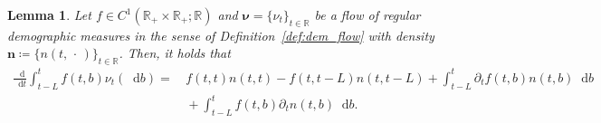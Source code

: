 \documentclass[10pt,a4paper]{amsart}
\theoremstyle{plain}
\newtheorem{lem}{Lemma}
\theoremstyle{plain}
\theoremstyle{definition}
\theoremstyle{remark}
\newcommand{\bn}{\mathbf{n}}
\newcommand{\bnu}{\boldsymbol{\nu}}
\newcommand{\dd}{\mathop{}\!\mathrm{d}}
\newcommand{\mbR}{\mathbb{R}}
\begin{document}
\begin{lem}\label{lem:diff_two_param_function_integral}
   Let $f\in C^1(\mbR_+\times \mbR_+ ;\mbR)$ and $\bnu = \{\nu_t\}_{t\in \mbR}$ be a flow of \emph{regular demographic measures} in the sense of Definition~\ref{def:dem_flow} with density $\bn \coloneqq \{n(t,\,\cdot\,)\}_{t\in \mbR}$. Then, it holds that
\begin{align*}
    \frac{\dd}{\dd t} \int_{t-L}^t f(t,b) \nu_t(\dd b)  = &\, f(t,t)n(t,t) -f(t,t-L)n(t,t-L) + \int_{t-L}^t \partial_t f(t,b) n(t,b)\dd b \\
    &\, + \int^t_{t-L} f(t,b) \partial_t n(t,b) \dd b.
\end{align*}
\end{lem}
\end{document}
